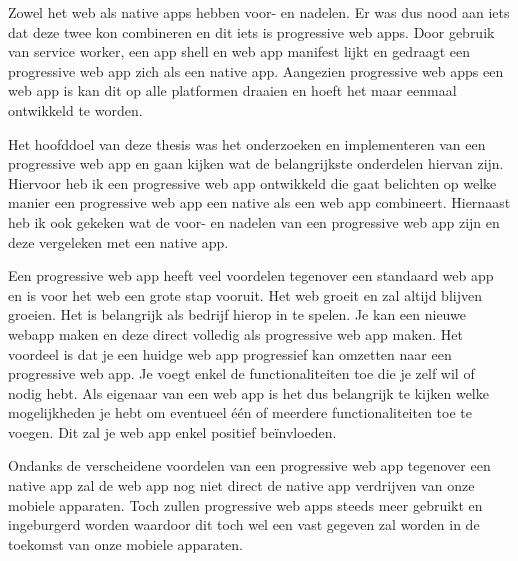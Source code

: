 Zowel het web als native apps hebben voor- en nadelen. Er was dus nood aan iets dat deze twee kon combineren en dit iets is progressive web apps. Door gebruik van service worker, een app shell en web app manifest lijkt en gedraagt een progressive web app zich als een native app. Aangezien progressive web apps een web app is kan dit op alle platformen draaien en hoeft het maar eenmaal ontwikkeld te worden. 

Het hoofddoel van deze thesis was het onderzoeken en implementeren van een progressive web app en gaan kijken wat de belangrijkste onderdelen hiervan zijn. Hiervoor heb ik een progressive web app ontwikkeld die gaat belichten op welke manier een progressive web app een native als een web app combineert. Hiernaast heb ik ook gekeken wat de voor- en nadelen van een progressive web app zijn en deze vergeleken met een native app.

Een progressive web app heeft veel voordelen tegenover een standaard web app en is voor het web een grote stap vooruit. Het web groeit en zal altijd blijven groeien. Het is belangrijk als bedrijf hierop in te spelen. Je kan een nieuwe webapp maken en deze direct volledig als progressive web app maken. Het voordeel is dat je een huidge web app progressief kan omzetten naar een progressive web app. Je voegt enkel de functionaliteiten toe die je zelf wil of nodig hebt. Als eigenaar van een web app is het dus belangrijk te kijken welke mogelijkheden je hebt om eventueel één of meerdere functionaliteiten toe te voegen. Dit zal je web app enkel positief beïnvloeden. 

Ondanks de verscheidene voordelen van een progressive web app tegenover een native app zal de web app nog niet direct de native app verdrijven van onze mobiele apparaten. Toch zullen progressive web apps steeds meer gebruikt en ingeburgerd worden waardoor dit toch wel een vast gegeven zal worden in de toekomst van onze mobiele apparaten.




